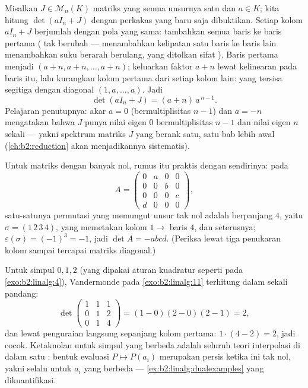 \begin{example}\label{ex:b2:linalg:onesmatrix}
Misalkan $J \in \mathcal{M}_n(K)$ matriks yang semua unsurnya satu dan
$a \in K$; kita hitung $\det(aI_n + J)$ dengan perkakas yang baru saja
dibuktikan. Setiap kolom $aI_n + J$ berjumlah dengan pola yang sama:
tambahkan semua baris ke baris pertama ( tak berubah ---
menambahkan kelipatan satu baris ke baris lain menambahkan suku berarah
berulang, yang ditolkan sifat ). Baris pertama menjadi
$(a + n, a + n, \dots, a + n)$; keluarkan faktor $a + n$ lewat
kelinearan pada baris itu, lalu kurangkan kolom pertama dari setiap
kolom lain: yang tersisa segitiga dengan diagonal $(1, a, \dots, a)$. Jadi
\[
\det(aI_n + J) = (a + n)\,a^{\,n-1}.
\]
Pelajaran penutupnya: akar $a = 0$ (bermultiplisitas $n - 1$) dan
$a = -n$ mengatakan bahwa $J$ punya nilai eigen $0$ bermultiplisitas
$n - 1$ dan nilai eigen $n$ sekali --- yakni spektrum matriks $J$ yang
berank satu, satu bab lebih awal (\cref{ch:b2:reduction} akan
menjadikannya sistematis).
\end{example}

\begin{example}\label{ex:b2:linalg:permexample}
Untuk matriks dengan banyak nol, rumus itu praktis dengan sendirinya:
pada
\[
A = \begin{pmatrix}
0 & a & 0 & 0\\
0 & 0 & b & 0\\
0 & 0 & 0 & c\\
d & 0 & 0 & 0
\end{pmatrix},
\]
satu-satunya permutasi yang memungut unsur tak nol adalah 
berpanjang $4$, yaitu $\sigma = (1\,2\,3\,4)$, yang memetakan kolom $1
\to$ baris $4$, dan seterusnya; $\varepsilon(\sigma) = (-1)^3 = -1$,
jadi $\det A = -abcd$. (Periksa lewat tiga penukaran kolom sampai
tercapai matriks diagonal.)
\end{example}

\begin{example}\label{ex:b2:linalg:vandermondework}
Untuk simpul $0, 1, 2$ (yang dipakai aturan kuadratur seperti pada
\cref{exo:b2:linalg:4}),  Vandermonde pada
\cref{exo:b2:linalg:11} terhitung dalam sekali pandang:
\[
\det\begin{pmatrix}
1 & 1 & 1\\
0 & 1 & 2\\
0 & 1 & 4
\end{pmatrix}
= (1 - 0)(2 - 0)(2 - 1) = 2 ,
\]
dan lewat penguraian langsung sepanjang kolom pertama: $1\cdot(4 - 2)
= 2$, jadi cocok. Ketaknolan untuk simpul yang berbeda adalah seluruh
teori interpolasi di dalam satu : bentuk evaluasi
$P \mapsto P(a_i)$ merupakan  persis ketika
 ini tak nol, yakni selalu untuk $a_i$ yang berbeda
--- \cref{ex:b2:linalg:dualexamples} yang dikuantifikasi.
\end{example}

